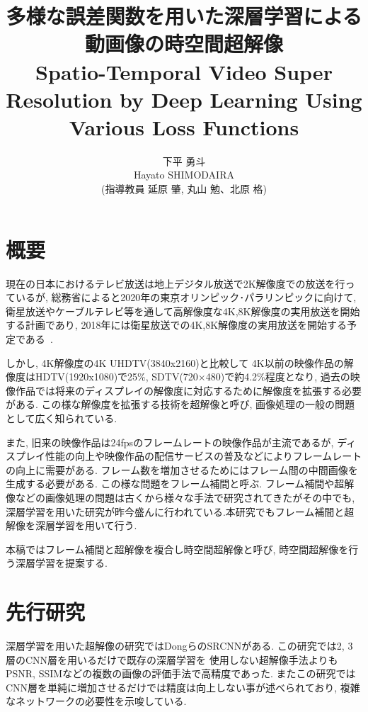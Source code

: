 \documentclass[twocolumn,a4j,uplatex]{jsarticle}
\title{{\Large 多様な誤差関数を用いた深層学習による動画像の時空間超解像} \\
Spatio-Temporal Video Super Resolution by Deep Learning Using Various Loss Functions}
\author{{\Large 下平 勇斗} \\ Hayato SHIMODAIRA \\ (指導教員 延原 肇, 丸山 勉、北原 格)}
\begin{document}
\maketitle
\thispagestyle{headings}
\section{概要}
現在の日本におけるテレビ放送は地上デジタル放送で2K解像度での放送を行っているが,
総務省によると2020年の東京オリンピック･パラリンピックに向けて,
衛星放送やケーブルテレビ等を通して高解像度な4K,8K解像度の実用放送を開始する計画であり,
2018年には衛星放送での4K,8K解像度の実用放送を開始する予定である~\cite{soumu}.

しかし, 4K解像度の4K UHDTV(3840x2160)と比較して
4K以前の映像作品の解像度はHDTV(1920x1080)で25\%, SDTV(720×480)で約4.2\%程度となり,
過去の映像作品では将来のディスプレイの解像度に対応するために解像度を拡張する必要がある.
この様な解像度を拡張する技術を超解像と呼び, 画像処理の一般の問題として広く知られている.

また, 旧来の映像作品は24fpsのフレームレートの映像作品が主流であるが,
ディスプレイ性能の向上や映像作品の配信サービスの普及などによりフレームレートの向上に需要がある.
フレーム数を増加させるためにはフレーム間の中間画像を生成する必要がある.
この様な問題をフレーム補間と呼ぶ.
フレーム補間や超解像などの画像処理の問題は古くから様々な手法で研究されてきたがその中でも,
深層学習を用いた研究が昨今盛んに行われている.本研究でもフレーム補間と超解像を深層学習を用いて行う.

本稿ではフレーム補間と超解像を複合し時空間超解像と呼び, 時空間超解像を行う深層学習を提案する.
\section{先行研究}
深層学習を用いた超解像の研究ではDongらのSRCNN\cite{Dong2015}がある.
この研究では2, 3層のCNN層を用いるだけで既存の深層学習を
使用しない超解像手法よりもPSNR, SSIMなどの複数の画像の評価手法で高精度であった.
またこの研究ではCNN層を単純に増加させるだけでは精度は向上しない事が述べられており,
複雑なネットワークの必要性を示唆している.
\end{document}
